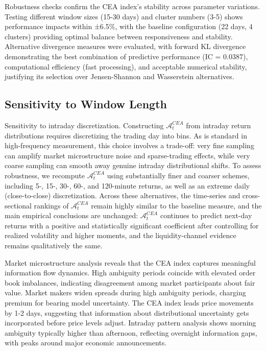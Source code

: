 \documentclass[preprint,12pt,authoryear]{elsarticle}
\renewcommand{\textcolor}[2]{\begingroup\color{#1}#2\endgroup}
\begin{document}
Robustness checks confirm the CEA index's stability across parameter variations. Testing different window sizes (15-30 days) and cluster numbers (3-5) shows performance impacts within ±6.5\%, with the baseline configuration (22 days, 4 clusters) providing optimal balance between responsiveness and stability. Alternative divergence measures were evaluated, with forward KL divergence demonstrating the best combination of predictive performance (IC = 0.0387), computational efficiency (fast processing), and acceptable numerical stability, justifying its selection over Jensen-Shannon and Wasserstein alternatives.

\subsection{Sensitivity to Window Length}
\textcolor{red}{Sensitivity to intraday discretization. Constructing $\mathcal{A}^{CEA}_t$ from intraday return distributions requires discretizing the trading day into bins. As is standard in high-frequency measurement, this choice involves a trade-off: very fine sampling can amplify market microstructure noise and sparse-trading effects, while very coarse sampling can smooth away genuine intraday distributional shifts. To assess robustness, we recompute $\mathcal{A}^{CEA}_t$ using substantially finer and coarser schemes, including 5-, 15-, 30-, 60-, and 120-minute returns, as well as an extreme daily (close-to-close) discretization. Across these alternatives, the time-series and cross-sectional rankings of $\mathcal{A}^{CEA}_t$ remain highly similar to the baseline measure, and the main empirical conclusions are unchanged: $\mathcal{A}^{CEA}_t$ continues to predict next-day returns with a positive and statistically significant coefficient after controlling for realized volatility and higher moments, and the liquidity-channel evidence remains qualitatively the same.}


Market microstructure analysis reveals that the CEA index captures meaningful information flow dynamics. High ambiguity periods coincide with elevated order book imbalances, indicating disagreement among market participants about fair value. Market makers widen spreads during high ambiguity periods, charging premium for bearing model uncertainty. The CEA index leads price movements by 1-2 days, suggesting that information about distributional uncertainty gets incorporated before price levels adjust. Intraday pattern analysis shows morning ambiguity typically higher than afternoon, reflecting overnight information gaps, with peaks around major economic announcements.
\end{document}
